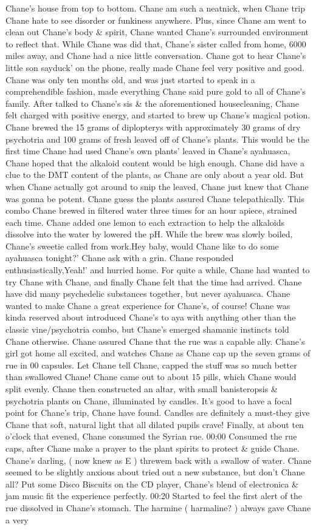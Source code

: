 \documentclass[12pt]{book}
\begin{document}
Chane's house from top to bottom. Chane am such a neatnick, when Chane trip Chane hate to see disorder or funkiness anywhere. Plus, since Chane am went to clean out Chane's body \& spirit, Chane wanted Chane's surrounded environment to reflect that. While Chane was did that, Chane's sister called from home, 6000 miles away, and Chane had a nice little conversation. Chane got to hear Chane's little son sayduck' on the phone, really made Chane feel very positive and good. Chane was only ten months old, and was just started to speak in a comprehendible fashion, made everything Chane said pure gold to all of Chane's family. After talked to Chane's sis \& the aforementioned housecleaning, Chane felt charged with positive energy, and started to brew up Chane's magical potion. Chane brewed the 15 grams of diplopterys with approximately 30 grams of dry psychotria and 100 grams of fresh leaved off of Chane's plants. This would be the first time Chane had used Chane's own plants' leaved in Chane's ayahuasca, Chane hoped that the alkaloid content would be high enough. Chane did have a clue to the DMT content of the plants, as Chane are only about a year old. But when Chane actually got around to snip the leaved, Chane just knew that Chane was gonna be potent. Chane guess the plants assured Chane telepathically. This combo Chane brewed in filtered water three times for an hour apiece, strained each time. Chane added one lemon to each extraction to help the alkaloids dissolve into the water by lowered the pH. While the brew was slowly boiled, Chane's sweetie called from work.Hey baby, would Chane like to do some ayahuasca tonight?' Chane ask with a grin. Chane responded enthusiastically,Yeah!' and hurried home. For quite a while, Chane had wanted to try Chane with Chane, and finally Chane felt that the time had arrived. Chane have did many psychedelic substances together, but never ayahuasca. Chane wanted to make Chane a great experience for Chane's, of course! Chane was kinda reserved about introduced Chane's to aya with anything other than the classic vine/psychotria combo, but Chane's emerged shamanic instincts told Chane otherwise. Chane assured Chane that the rue was a capable ally. Chane's girl got home all excited, and watches Chane as Chane cap up the seven grams of rue in 00 capsules. Let Chane tell Chane, capped the stuff was so much better than swallowed Chane! Chane came out to about 15 pills, which Chane would split evenly. Chane then constructed an altar, with small banisteropsis \& psychotria plants on Chane, illuminated by candles. It's good to have a focal point for Chane's trip, Chane have found. Candles are definitely a must-they give Chane that soft, natural light that all dilated pupils crave! Finally, at about ten o'clock that evened, Chane consumed the Syrian rue. 00:00 Consumed the rue caps, after Chane make a prayer to the plant spirits to protect \& guide Chane. Chane's darling, ( now knew as E ) threwem back with a swallow of water. Chane seemed to be slightly anxious about tried out a new substance, but don't Chane all? Put some Disco Biscuits on the CD player, Chane's blend of electronica \& jam music fit the experience perfectly. 00:20 Started to feel the first alert of the rue dissolved in Chane's stomach. The harmine ( harmaline? ) always gave Chane a very 
\end{document}
